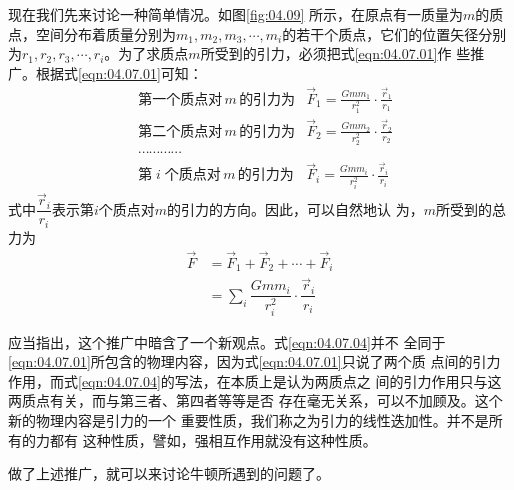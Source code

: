 \documentclass[../outline-of-mechanics.tex]{subfiles}
\begin{document}
现在我们先来讨论一种简单情况。如图\ref{fig:04.09}
所示，在原点有一质量为$ m $的质点，空间分布着质量分别为$ m _ { 1 } , m _ { 2 } , m _ { 3 } , \cdots , m _ { i } $的若干个质点，它们的位置矢径分别为$ r _ { 1 } , r _ { 2 } ,
  r _ { 3 } , \cdots , r _ { i } $。为了求质点$ m $所受到的引力，必须把式\eqref{eqn:04.07.01}作
些推广。根据式\eqref{eqn:04.07.01}可知：
{\setlength{\mathindent}{2em}
\begin{equation}\label{eqn:04.07.03}
  \begin{aligned}
     & \text{第一个质点对}\,m\,\text{的引力为}
     & \vec{F} _ { 1 } = \frac { G m m _ { 1 } } { r _ 1 ^ { 2 } } \cdot \frac { \vec{r} _ { 1 } } { r _ { 1 } } \\
     & \text{第二个质点对}\,m\,\text{的引力为}
     & \vec{F} _ { 2 } = \frac { G m m _ { 2 } } { r _ 2 ^ { 2 } } \cdot \frac { \vec{r} _ { 2 } } { r _ { 2 } } \\
     & \cdots \cdots \cdots \cdots                                                                               \\
     & \text{第}\;i\;\text{个质点对}\,m\,\text{的引力为}
     & \vec{F} _ { i } = \frac { G m m _ { i } } { r _ i ^ { 2 } } \cdot \frac { \vec{r} _ { i } } { r _ { i } }
  \end{aligned}
\end{equation}}%
式中$ \dfrac { \vec{r} _ { i } } { r _ { i } } $表示第$ i $个质点对$ m $的引力的方向。因此，可以自然地认
为，$ m $所受到的总力为
\begin{equation}\label{eqn:04.07.04}
  \begin{aligned}
    \vec{F} & = \vec{F} _ { 1 } + \vec{F} _ { 2 } + \cdots + \vec{F} _ { i }                                           \\
            & = \sum _ i { \dfrac { G m m _ { i } } { r _ { i } ^ 2 } \cdot \dfrac { \vec{r} _ { i } } { r _ { i } } }
  \end{aligned}
\end{equation}

应当指出，这个推广中暗含了一个新观点。式\eqref{eqn:04.07.04}并不
全同于\eqref{eqn:04.07.01}所包含的物理内容，因为式\eqref{eqn:04.07.01}只说了两个质
点间的引力作用，而式\eqref{eqn:04.07.04}的写法，在本质上是认为两质点之
间的引力作用只与这两质点有关，而与第三者、第四者等等是否
存在毫无关系，可以不加顾及。这个新的物理内容是引力的一个
重要性质，我们称之为引力的线性迭加性。并不是所有的力都有
这种性质，譬如，强相互作用就没有这种性质。

做了上述推广，就可以来讨论牛顿所遇到的问题了。
\end{document}
